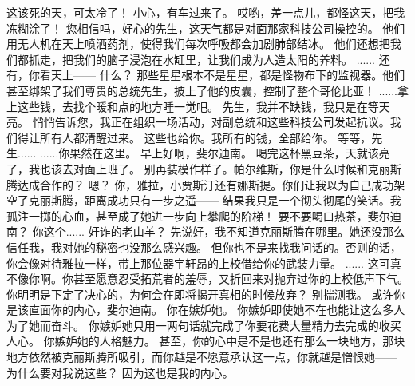 \documentclass[openany]{book}
\begin{document}
\begin{dialogue}
     这该死的天，可太冷了！
     小心，有车过来了。
     哎哟，差一点儿，都怪这天，把我冻糊涂了！
     您相信吗，好心的先生，这天气都是对面那家科技公司操控的。
     他们用无人机在天上喷洒药剂，使得我们每次呼吸都会加剧肺部结冰。
     他们还想把我们都抓走，把我们的脑子浸泡在水缸里，让我们成为人造太阳的养料。
     ......
     还有，你看天上——
     什么？
     那些星星根本不是星星，都是怪物布下的监视器。他们甚至绑架了我们尊贵的总统先生，披上了他的皮囊，控制了整个哥伦比亚！
     ......拿上这些钱，去找个暖和点的地方睡一觉吧。
     先生，我并不缺钱，我只是在等天亮。
     悄悄告诉您，我正在组织一场活动，对副总统和这些科技公司发起抗议。我们得让所有人都清醒过来。
     这些也给你。我所有的钱，全部给你。
     等等，先生......
     ......你果然在这里。
     早上好啊，斐尔迪南。
     喝完这杯黑豆茶，天就该亮了，我也该去对面上班了。
     别再装模作样了。帕尔维斯，你是什么时候和克丽斯腾达成合作的？
     嗯？
     你，雅拉，小贾斯汀还有娜斯提。你们让我以为自己成功架空了克丽斯腾，距离成功只有一步之遥——
     结果我只是一个彻头彻尾的笑话。我孤注一掷的心血，甚至成了她进一步向上攀爬的阶梯！
     要不要喝口热茶，斐尔迪南？
     你这个......
     奸诈的老山羊？
     先说好，我不知道克丽斯腾在哪里。她还没那么信任我，我对她的秘密也没那么感兴趣。
     但你也不是来找我问话的。否则的话，你会像对待雅拉一样，带上那位器宇轩昂的上校借给你的武装力量。
     ......
     这可真不像你啊。你甚至愿意忍受拓荒者的羞辱，又折回来对抛弃过你的上校低声下气。
     你明明是下定了决心的，为何会在即将揭开真相的时候放弃？
     别揣测我。
     或许你是该直面你的内心，斐尔迪南。
     你在嫉妒她。
     你嫉妒即使她不在也能让这么多人为了她而奋斗。
     你嫉妒她只用一两句话就完成了你要花费大量精力去完成的收买人心。
     你嫉妒她的人格魅力。
     甚至，你的心中是不是也还有那么一块地方，那块地方依然被克丽斯腾所吸引，而你越是不愿意承认这一点，你就越是憎恨她——
     为什么要对我说这些？
     因为这也是我的内心。

\end{dialogue}
\end{document}
